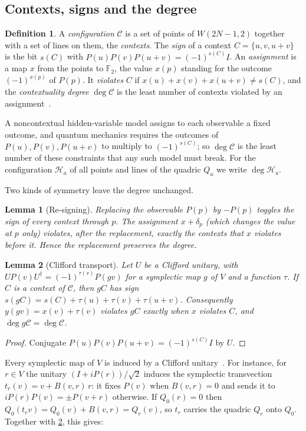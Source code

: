 \documentclass[11pt]{article}
\newtheorem{lemma}[lemma]{Lemma}
\theoremstyle{definition}
\newtheorem{definition}[definition]{Definition}
\theoremstyle{remark}
\newcommand{\F}{\mathbb{F}}
\newcommand{\dg}{\operatorname{deg}}
\begin{document}
\subsection{Contexts, signs and the degree}
\begin{definition}
A \emph{configuration} $\mathcal C$ is a set of points of $W(2N-1,2)$ together with a set of lines on them, the \emph{contexts}.
The \emph{sign} of a context $C=\{u,v,u+v\}$ is the bit $s(C)$ with $P(u)P(v)P(u+v)=(-1)^{s(C)}I$.
An \emph{assignment} is a map $x$ from the points to $\F_2$, the value $x(p)$ standing for the outcome $(-1)^{x(p)}$ of $P(p)$.
It \emph{violates} $C$ if $x(u)+x(v)+x(u+v)\neq s(C)$, and the \emph{contextuality degree} $\dg\mathcal C$ is the least number of contexts violated by an assignment~\cite{deBoutray22}.
\end{definition}

A noncontextual hidden-variable model assigns to each observable a fixed outcome, and quantum mechanics requires the outcomes of $P(u),P(v),P(u+v)$ to multiply to $(-1)^{s(C)}$; so $\dg\mathcal C$ is the least number of these constraints that any such model must break.
For the configuration $\mathcal H_a$ of all points and lines of the quadric $Q_a$ we write $\dg\mathcal H_a$.

Two kinds of symmetry leave the degree unchanged.

\begin{lemma}[Re-signing]\label{lem:resign}
Replacing the observable $P(p)$ by $-P(p)$ toggles the sign of every context through $p$. The assignment $x+\delta_p$ (which changes the value at $p$ only) violates, after the replacement, exactly the contexts that $x$ violates before it. Hence the replacement preserves the degree.
\end{lemma}

\begin{lemma}[Clifford transport]\label{lem:clifford}
Let $U$ be a Clifford unitary, with $UP(v)U^\dagger=(-1)^{\tau(v)}P(gv)$ for a symplectic map $g$ of $V$ and a function $\tau$.
If $C$ is a context of $\mathcal C$, then $gC$ has sign $s(gC)=s(C)+\tau(u)+\tau(v)+\tau(u+v)$.
Consequently $y(gv)=x(v)+\tau(v)$ violates $gC$ exactly when $x$ violates $C$, and $\dg g\mathcal C=\dg\mathcal C$.
\end{lemma}
\begin{proof}
Conjugate $P(u)P(v)P(u+v)=(-1)^{s(C)}I$ by $U$.
\end{proof}

Every symplectic map of $V$ is induced by a Clifford unitary~\cite{Gottesman98,DehaeneDeMoor03}.
For instance, for $r\in V$ the unitary $(I+iP(r))/\sqrt2$ induces the symplectic transvection $t_r(v)=v+B(v,r)\,r$: it fixes $P(v)$ when $B(v,r)=0$ and sends it to $iP(r)P(v)=\pm P(v+r)$ otherwise.
If $Q_0(r)=0$ then $Q_0(t_rv)=Q_0(v)+B(v,r)=Q_r(v)$, so $t_r$ carries the quadric $Q_r$ onto $Q_0$.
Together with \cref{lem:clifford}, this gives:
\end{document}
